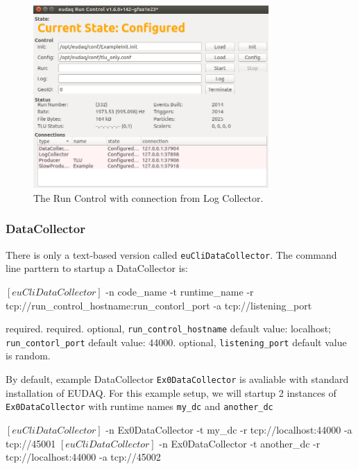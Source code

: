 \begin{figure}[htb]
  \begin{center}
    \includegraphics[width=0.8\textwidth]{src/images/RunControl}
    \caption{The Run Control with connection from Log Collector.}
    \label{fig:RunControl_con_log}
  \end{center}
\end{figure}


\subsubsection{DataCollector}
\label{sec:datacollector}
There is only a text-based version called \texttt{euCliDataCollector}.
The command line parttern to startup a DataCollector is:
\begin{listing}[mybash]
$[euCliDataCollector]$ -n {code_name} -t {runtime_name} -r tcp://{run_control_hostname}:{run_contorl_port} -a tcp://{listening_port}
\end{listing}

\begin{description}
required.
required.
optional, \texttt{run\_control\_hostname} default value: localhost;  \texttt{run\_contorl\_port}  default value: 44000.
optional, \texttt{listening\_port} default value is random.
\end{description}

By default, example DataCollector \texttt{Ex0DataCollector} is avaliable with standard installation of EUDAQ.
For this example setup, we will startup 2 instances of \texttt{Ex0DataCollector} with runtime names \texttt{my\_dc} and \texttt{another\_dc}\\
\begin{listing}[mybash]
$[euCliDataCollector]$ -n Ex0DataCollector -t my_dc -r tcp://localhost:44000 -a tcp://45001
$[euCliDataCollector]$ -n Ex0DataCollector -t another_dc -r tcp://localhost:44000 -a tcp://45002
\end{listing}

